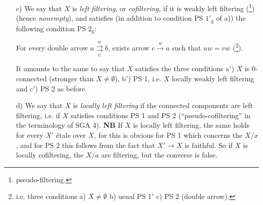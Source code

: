 \documentclass[11pt]{article}
\newcommand{\msp}[1]{\marginpar{\footnotesize [#1]}}
\begin{document}
\begin{enumerate}[label={},leftmargin=3em]
\msp{page 16}

\textbf{NB} If $X$ locally weakly left filtering, every $X'$ étale over $X$ likewise.

\textbf{NB} (\footnote[17]{\textbf{False.}}) $X$ locally weakly left filtering $\Longleftrightarrow$ the connected components are weakly left filtering, or again if $X$ is 0-connected, $X$ locally weakly left filtering $\Longleftrightarrow$ $X$ is weakly left filtering (\footnote[18]{pseudo-filtering.}). We have indeed $\Longleftarrow$ tautologically (\footnote[19]{\textbf{false,} thus $0 \underset{\beta}{\overset{\alpha}{\rightrightarrows}} 1$ is 0-connected and weakly left filtering, but not locally weakly left filtering because
cannot be completed to a \textit{commutative} square.}), and $\Longrightarrow$ by showing that if PS 1 satisfied, then $PS(a,b)$ defined by $X/[a] \cap X/[b] \neq \emptyset$ is an equivalence relation, implied by the relation $C(a,b)$: $\{\operatorname{Hom}(a,b) \neq \emptyset$ \textit{or} $\operatorname{Hom}(b,a) \neq \emptyset\}$, hence the equivalence relation (homotopy) generated by $C(a,b)$ is finer than $PS(a,b)$.

\item[c)] We say that $X$ is \textit{left filtering}, or \textit{cofiltering,} if it is weakly left filtering (\footnote[20]{pseudo-filtering.}) (hence \textit{nonempty}), and satisfies (in addition to condition PS $1'_{\mathrm{g}}$ of a)) the following condition PS $2_{\mathrm{g}}$:

For every double arrow $a \underset{v}{\overset{u}{\rightrightarrows}} b$, exists arrow $c \xrightarrow{w} a$ such that $uw = vw$ (\footnote[21]{i.e. three conditions a) $X \neq \emptyset$ b) usual PS $1'$ c) PS 2 (double arrow).}).

It amounts to the same to say that $X$ satisfies the three conditions a$'$) $X$ is 0-connected (stronger than $X \neq \emptyset$), b$'$) PS 1, i.e. $X$ locally weakly left filtering and c$'$) PS 2 as before.

\item[d)] We say that $X$ is \textit{locally left filtering} if the connected components are left filtering, i.e. if $X$ satisfies conditions PS 1 and PS 2 (``pseudo-cofiltering'' in the terminology of SGA 4). \textbf{NB} If $X$ is locally left filtering, the same holds for every $X'$ étale over $X$, for this is obvious for PS 1 which concerns the $X/x$, and for PS 2 this follows from the fact that $X' \longrightarrow X$ is faithful. So if $X$ is locally cofiltering, the $X/a$ are filtering, but the converse is false.
\end{enumerate}
\end{document}
